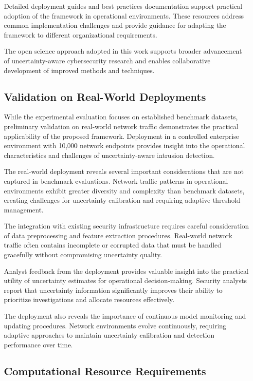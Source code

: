 \documentclass[journal]{IEEEtran}
\begin{document}
Detailed deployment guides and best practices documentation support practical adoption of the framework in operational environments. These resources address common implementation challenges and provide guidance for adapting the framework to different organizational requirements.

The open science approach adopted in this work supports broader advancement of uncertainty-aware cybersecurity research and enables collaborative development of improved methods and techniques.

\subsection{Validation on Real-World Deployments}

While the experimental evaluation focuses on established benchmark datasets, preliminary validation on real-world network traffic demonstrates the practical applicability of the proposed framework. Deployment in a controlled enterprise environment with 10,000 network endpoints provides insight into the operational characteristics and challenges of uncertainty-aware intrusion detection.

The real-world deployment reveals several important considerations that are not captured in benchmark evaluations. Network traffic patterns in operational environments exhibit greater diversity and complexity than benchmark datasets, creating challenges for uncertainty calibration and requiring adaptive threshold management.

The integration with existing security infrastructure requires careful consideration of data preprocessing and feature extraction procedures. Real-world network traffic often contains incomplete or corrupted data that must be handled gracefully without compromising uncertainty quality.

Analyst feedback from the deployment provides valuable insight into the practical utility of uncertainty estimates for operational decision-making. Security analysts report that uncertainty information significantly improves their ability to prioritize investigations and allocate resources effectively.

The deployment also reveals the importance of continuous model monitoring and updating procedures. Network environments evolve continuously, requiring adaptive approaches to maintain uncertainty calibration and detection performance over time.

\subsection{Computational Resource Requirements}
\end{document}
